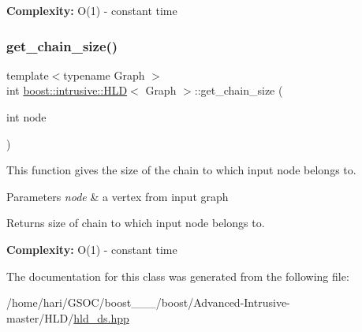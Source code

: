 {\bfseries  Complexity\+: } O(1) -\/ constant time \mbox{\label{classboost_1_1intrusive_1_1HLD_a52a0f91efab2e5fcee4e715dffb114cf}} 
\subsubsection{\texorpdfstring{get\+\_\+chain\+\_\+size()}{get\_chain\_size()}}
{\footnotesize\ttfamily template$<$typename Graph $>$ \\
int \hyperlink{classboost_1_1intrusive_1_1HLD}{boost\+::intrusive\+::\+H\+LD}$<$ Graph $>$\+::get\+\_\+chain\+\_\+size (\begin{DoxyParamCaption}\item[{int}]{node }\end{DoxyParamCaption})\hspace{0.3cm}{\ttfamily [inline]}}


\begin{DoxyItemize}
\item This function gives the size of the chain to which input node belongs to.  
\end{DoxyItemize}
\begin{DoxyParams}{Parameters}
{\em node} & a vertex from input graph \\
\hline
\end{DoxyParams}
\begin{DoxyReturn}{Returns}
size of chain to which input node belongs to. 
\end{DoxyReturn}


{\bfseries  Complexity\+: } O(1) -\/ constant time 

The documentation for this class was generated from the following file\+:\begin{DoxyCompactItemize}
\item 
/home/hari/\+G\+S\+O\+C/boost\+\_\+\_\+\_/boost/\+Advanced-\/\+Intrusive-\/master/\+H\+L\+D/\hyperlink{hld__ds_8hpp}{hld\+\_\+ds.\+hpp}\end{DoxyCompactItemize}
